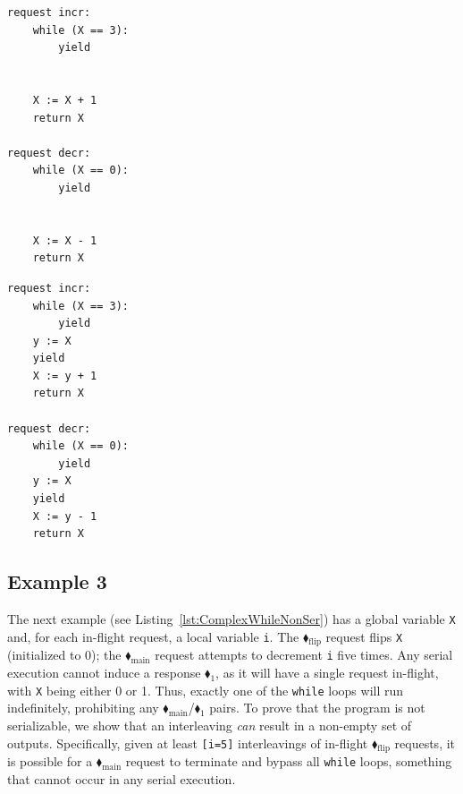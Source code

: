 \noindent
\begin{minipage}[t]{0.45\textwidth}
	\begin{lstlisting}[caption={Serializable},
		label={lst:FredSer},numbers=none]
request incr: 
    while (X == 3):
        yield


    X := X + 1
    return X		

request decr: 
    while (X == 0): 
        yield


    X := X - 1
    return X
		\end{lstlisting}
\end{minipage}
\hfill
\begin{minipage}[t]{0.45\textwidth}
	\begin{lstlisting}[caption={Not serializable},
		label={lst:FredNonSer},numbers=none]
request incr:
    while (X == 3):
        yield
    y := X
    yield
    X := y + 1
    return X		

request decr: 
    while (X == 0):
        yield
    y := X
    yield
    X := y - 1
    return X
		\end{lstlisting}
\end{minipage}
	
\subsection{Example 3}

The next example (see Listing~\ref{lst:ComplexWhileNonSer}) has a global variable \texttt{X} and, for each in-flight request, a local variable \texttt{i}. The {\color{ForestGreen}$\blacklozenge_\text{flip}$} request flips \texttt{X} (initialized to 0); the {\color{ForestGreen}$\blacklozenge_\text{main}$} request attempts to decrement \texttt{i} five times.
%
%
Any serial execution cannot induce a response {\color{red}$\blacklozenge_1$}, 
as it will have a single request in-flight, with \texttt{X} being either 0 or 1. Thus, exactly one of the \texttt{while} loops will run indefinitely, prohibiting any {\color{ForestGreen}$\blacklozenge_\text{main}$}/{\color{red}$\blacklozenge_1$} pairs.
%
%
To prove that the program is not serializable, we show that an interleaving \emph{can} result in a non-empty set of outputs. 
%
%
Specifically, given at least \texttt{[i=5]} interleavings of in-flight {\color{ForestGreen}$\blacklozenge_\text{flip}$} requests, it is possible for a {\color{ForestGreen}$\blacklozenge_\text{main}$} request to terminate and bypass all \texttt{while} loops, something that cannot occur in any serial execution.
%

